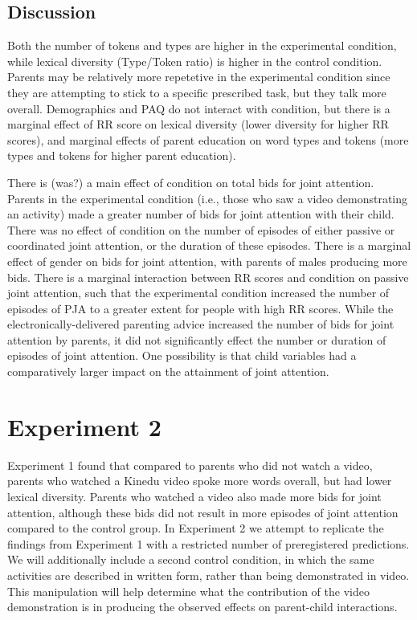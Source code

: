 \documentclass[10pt, letterpaper]{article}
\begin{document}
\subsection{Discussion}\label{discussion}

Both the number of tokens and types are higher in the experimental
condition, while lexical diversity (Type/Token ratio) is higher in the
control condition. Parents may be relatively more repetetive in the
experimental condition since they are attempting to stick to a specific
prescribed task, but they talk more overall. Demographics and PAQ do not
interact with condition, but there is a marginal effect of RR score on
lexical diversity (lower diversity for higher RR scores), and marginal
effects of parent education on word types and tokens (more types and
tokens for higher parent education).

There is (was?) a main effect of condition on total bids for joint
attention. Parents in the experimental condition (i.e., those who saw a
video demonstrating an activity) made a greater number of bids for joint
attention with their child. There was no effect of condition on the
number of episodes of either passive or coordinated joint attention, or
the duration of these episodes. There is a marginal effect of gender on
bids for joint attention, with parents of males producing more bids.
There is a marginal interaction between RR scores and condition on
passive joint attention, such that the experimental condition increased
the number of episodes of PJA to a greater extent for people with high
RR scores. While the electronically-delivered parenting advice increased
the number of bids for joint attention by parents, it did not
significantly effect the number or duration of episodes of joint
attention. One possibility is that child variables had a comparatively
larger impact on the attainment of joint attention.

\section{Experiment 2}\label{experiment-2}

Experiment 1 found that compared to parents who did not watch a video,
parents who watched a Kinedu video spoke more words overall, but had
lower lexical diversity. Parents who watched a video also made more bids
for joint attention, although these bids did not result in more episodes
of joint attention compared to the control group. In Experiment 2 we
attempt to replicate the findings from Experiment 1 with a restricted
number of preregistered predictions. We will additionally include a
second control condition, in which the same activities are described in
written form, rather than being demonstrated in video. This manipulation
will help determine what the contribution of the video demonstration is
in producing the observed effects on parent-child interactions.
\end{document}
